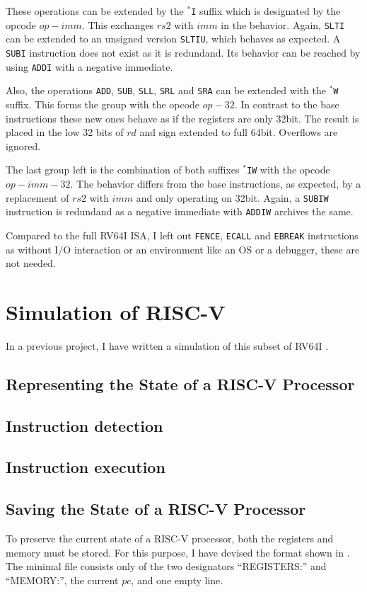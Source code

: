 These operations can be extended by the \texttt{$^*$I} suffix which
is designated by the opcode $op-imm$. This exchanges $rs2$ with $imm$
in the behavior. Again, \texttt{SLTI} can be extended to an unsigned
version \texttt{SLTIU}, which behaves as expected. A \texttt{SUBI}
instruction does not exist as it is redundand. Its behavior can be
reached by using \texttt{ADDI} with a negative immediate.

Also, the operations \texttt{ADD}, \texttt{SUB}, \texttt{SLL},
\texttt{SRL} and \texttt{SRA} can be extended with the \texttt{$^*$W}
suffix. This forms the group with the opcode $op-32$. In contrast to
the base instructions these new ones behave as if the registers are
only 32bit. The result is placed in the low 32 bits of $rd$ and sign
extended to full 64bit. Overflows are ignored.

The last group left is the combination of both suffixes
\texttt{$^*$IW} with the opcode $op-imm-32$. The behavior differs
from the base instructions, as expected, by a replacement of $rs2$
with $imm$ and only operating on 32bit. Again, a \texttt{SUBIW}
instruction is redundand as a negative immediate with \texttt{ADDIW}
archives the same.

Compared to the full RV64I ISA, I left out \texttt{FENCE},
\texttt{ECALL} and \texttt{EBREAK} instructions as without I/O
interaction or an environment like an OS or a debugger, these are not
needed.

\section{Simulation of RISC-V}\label{sec:simulation}
In a previous project, I have written a simulation of this subset of
RV64I \cite{repoSim}.

\subsection{Representing the State of a RISC-V Processor}
\subsection{Instruction detection}
\subsection{Instruction execution}

\subsection{Saving the State of a RISC-V
      Processor}\label{sub:statefile}

To preserve the current state of a RISC-V processor, both the
registers and memory must be stored. For this purpose, I have devised
the format shown in . The minimal file consists
only of the two designators \enquote{REGISTERS:} and
\enquote{MEMORY:}, the current $pc$, and one empty line.

